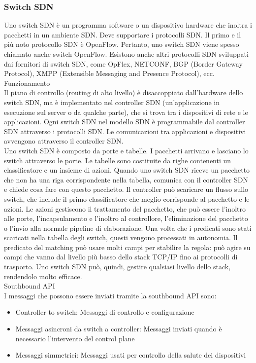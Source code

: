 \documentclass{article}
\begin{document}
		\subsubsection{Switch SDN}
		Uno switch SDN è un programma software o un dispositivo hardware che inoltra i pacchetti in un ambiente SDN. Deve supportare i protocolli SDN. Il primo e il più noto protocollo SDN è OpenFlow. Pertanto, uno switch SDN viene spesso chiamato anche switch OpenFlow. Esistono anche altri protocolli SDN sviluppati dai fornitori di switch SDN, come OpFlex, NETCONF, BGP (Border Gateway Protocol), XMPP (Extensible Messaging and Presence Protocol), ecc.\\
		Funzionamento\\
		Il piano di controllo (routing di alto livello) è disaccoppiato dall'hardware dello switch SDN, ma è implementato nel controller SDN (un'applicazione in esecuzione sul server o da qualche parte), che si trova tra i dispositivi di rete e le applicazioni.
		Ogni switch SDN nel modello SDN è programmabile dal controller SDN attraverso i protocolli SDN. Le comunicazioni tra applicazioni e dispositivi avvengono attraverso il controller SDN.\\
		Uno switch SDN è composto da porte e tabelle. I pacchetti arrivano e lasciano lo switch attraverso le porte. Le tabelle sono costituite da righe contenenti un classificatore e un insieme di azioni. Quando uno switch SDN riceve un pacchetto che non ha una riga corrispondente nella tabella, comunica con il controller SDN e chiede cosa fare con questo pacchetto. Il controller può scaricare un flusso sullo switch, che include il primo classificatore che meglio corrisponde al pacchetto e le azioni.
		Le azioni gestiscono il trattamento del pacchetto, che può essere l'inoltro alle porte, l'incapsulamento e l'inoltro al controllore, l'eliminazione del pacchetto o l'invio alla normale pipeline di elaborazione. Una volta che i predicati sono stati scaricati nella tabella degli switch, questi vengono processati in autonomia. Il predicato del matching può usare molti campi per stabilire la regola: può agire su campi che vanno dal livello più basso dello stack TCP/IP fino ai protocolli di trasporto. Uno switch SDN può, quindi, gestire qualsiasi livello dello stack, rendendolo molto efficace.\\
		Southbound API \\
		I messaggi che possono essere inviati tramite la southbound API sono:
		\begin{itemize}
		\item Controller to switch: Messaggi di controllo e configurazione
		\item Messaggi asincroni da switch a controller: Messaggi inviati quando è necessario l'intervento del control plane
		\item Messaggi simmetrici: Messaggi usati per controllo della salute dei dispositivi
		\end{itemize}
\end{document}
